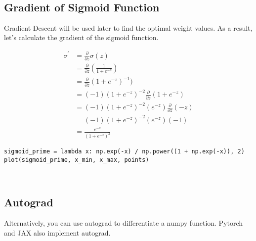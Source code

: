 \documentclass[openany]{book}
\begin{document}
    \begin{center}
    \end{center}
    { \hspace*{\fill} \\}
    
    \subsection{Gradient of Sigmoid
Function}\label{gradient-of-sigmoid-function}

Gradient Descent will be used later to find the optimal weight values.
As a result, let's calculate the gradient of the sigmoid function.

    \begin{align*}
\sigma^\prime
&= \frac{\partial}{\partial z} \sigma(z) \\
&= \frac{\partial}{\partial z} (\frac{1}{1+e^{-z}}) \\
&= \frac{\partial}{\partial z} (1+e^{-z})^{-1}) \\
&= (-1)(1+e^{-z})^{-2}\frac{\partial}{\partial z}(1+e^{-z}) \\
&= (-1)(1+e^{-z})^{-2}(e^{-z})\frac{\partial}{\partial z}(-z) \\
&= (-1)(1+e^{-z})^{-2}(e^{-z})(-1) \\
&= \frac{e^{-z}}{(1+e^{-z})^{2}}
\end{align*}

\begin{tcolorbox}
\tiny
\begin{verbatim}
sigmoid_prime = lambda x: np.exp(-x) / np.power((1 + np.exp(-x)), 2)
plot(sigmoid_prime, x_min, x_max, points)
\end{verbatim}
\end{tcolorbox}

    \begin{center}
    \end{center}
    { \hspace*{\fill} \\}
    
    \subsection{Autograd}\label{autograd}

Alternatively, you can use autograd to differentiate a numpy function.
Pytorch and JAX also implement autograd.
\end{document}
